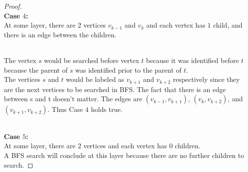 \documentclass{article}
\theoremstyle{definition}
\theoremstyle{remark}
\theoremstyle{plain}
\begin{document}
\begin{proof}
\\

\textbf{Case $4$:} \\
At some layer, there are $2$ vertices $v_{k-1}$ and $v_k$ and each vertex has $1$ child, and there is an edge between the children.\\

\\

The vertex $s$ would be searched before vertex $t$ because it was identified before $t$ because the parent of $s$ was identified prior to the parent of $t$.\\
The vertices $s$ and $t$ would be labeled as $v_{k+1}$ and $v_{k+2}$ respectively since they are the next vertices to be searched in BFS. The fact that there is an edge between s and t doesn't matter. The edges are $(v_{k-1}, v_{k+1})$, $(v_k, v_{k+2})$, and $(v_{k+1}, v_{k+2})$. Thus Case $4$ holds true.\\

\\

\textbf{Case $5$:}\\
At some layer, there are $2$ vertices and each vertex has $0$ children.\\
A BFS search will conclude at this layer because there are no further children to search.

\end{proof}
\end{document}
